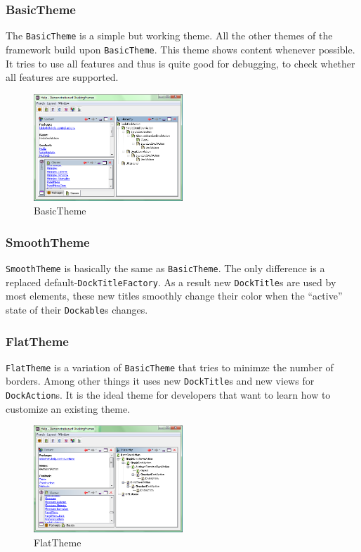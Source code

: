 \documentclass[a4paper,10pt]{article}
\newcommand{\src}[1]{\texttt{#1}}
\begin{document}
\subsubsection{BasicTheme}
The \src{BasicTheme} is a simple but working theme. All the other themes of the framework build upon \src{BasicTheme}. This theme shows content whenever possible. It tries to use all features and thus is quite good for debugging, to check whether all features are supported.

\begin{figure}[ht]
\centering
\includegraphics[width=0.5\textwidth]{theme_default}
\caption{BasicTheme}
\label{fig:theme_flat}
\end{figure}

\subsubsection{SmoothTheme}
\src{SmoothTheme} is basically the same as \src{BasicTheme}. The only difference is a replaced default-\src{DockTitleFactory}. As a result new \src{DockTitle}s are used by most elements, these new titles smoothly change their color when the ``active'' state of their \src{Dockable}s changes.

\subsubsection{FlatTheme}
\src{FlatTheme} is a variation of \src{BasicTheme} that tries to minimze the number of borders. Among other things it uses new \src{DockTitle}s and new views for \src{DockAction}s. It is the ideal theme for developers that want to learn how to customize an existing theme.

\begin{figure}[ht]
\centering
\includegraphics[width=0.5\textwidth]{theme_flat}
\caption{FlatTheme}
\label{fig:theme_basic}
\end{figure}
\end{document}
